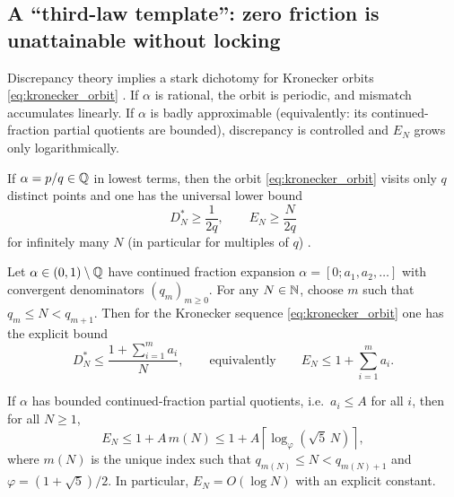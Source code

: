 \subsection{A ``third-law template'': zero friction is unattainable without locking}
\label{sec:third_law_template}

Discrepancy theory implies a stark dichotomy for Kronecker orbits \eqref{eq:kronecker_orbit} \cite{KuipersNiederreiter1974,Cassels1957}.
If $\alpha$ is rational, the orbit is periodic, and mismatch accumulates linearly.
If $\alpha$ is badly approximable (equivalently: its continued-fraction partial quotients are bounded), discrepancy is controlled and $E_N$ grows only logarithmically.

\begin{proposition}
\label{prop:rational_locking}
If $\alpha=p/q\in\mathbb{Q}$ in lowest terms, then the orbit \eqref{eq:kronecker_orbit} visits only $q$ distinct points and one has the universal lower bound
\begin{equation}
  D_N^\ast \ge \frac{1}{2q},
  \qquad
  E_N \ge \frac{N}{2q}
  \label{eq:rational_linear}
\end{equation}
for infinitely many $N$ (in particular for multiples of $q$) \cite{KuipersNiederreiter1974,DrmotaTichy1997}.
\end{proposition}

\begin{theorem}
\label{thm:cf_discrepancy}
Let $\alpha\in(0,1)\setminus\mathbb{Q}$ have continued fraction expansion $\alpha=[0;a_1,a_2,\dots]$ with convergent denominators $(q_m)_{m\ge 0}$.
For any $N\in\mathbb{N}$, choose $m$ such that $q_m\le N<q_{m+1}$.
Then for the Kronecker sequence \eqref{eq:kronecker_orbit} one has the explicit bound \cite{KuipersNiederreiter1974,DrmotaTichy1997}
\begin{equation}
  D_N^\ast \le \frac{1+\sum_{i=1}^m a_i}{N},
  \qquad\text{equivalently}\qquad
  E_N \le 1+\sum_{i=1}^m a_i.
  \label{eq:cf_discrepancy_bound}
\end{equation}
\end{theorem}

\begin{corollary}
\label{cor:bounded_partial_quotients}
If $\alpha$ has bounded continued-fraction partial quotients, i.e.\ $a_i\le A$ for all $i$, then for all $N\ge 1$,
\begin{equation}
  E_N \le 1 + A\,m(N)
  \le 1 + A\left\lceil \log_{\varphi}\!\left(\sqrt{5}\,N\right)\right\rceil,
  \label{eq:EN_bounded_A}
\end{equation}
where $m(N)$ is the unique index such that $q_{m(N)}\le N<q_{m(N)+1}$ and $\varphi=(1+\sqrt{5})/2$.
In particular, $E_N=O(\log N)$ with an explicit constant.
\end{corollary}

